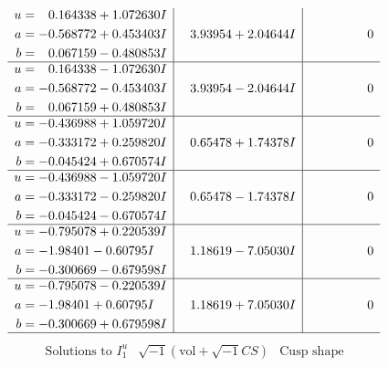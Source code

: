 \documentclass[1p]{elsarticle_modified}
\theoremstyle{definition}
\newcommand{\I}{\sqrt{-1}}
\begin{document}
$$\begin{array}{c|c|c}
\begin{aligned}
u &= \phantom{-}0.164338 + 1.072630 I \\
a &= -0.568772 + 0.453403 I \\
b &= \phantom{-}0.067159 - 0.480853 I\end{aligned}
 & \phantom{-}3.93954 + 2.04644 I & \phantom{-0.000000 } 0 \\ \hline\begin{aligned}
u &= \phantom{-}0.164338 - 1.072630 I \\
a &= -0.568772 - 0.453403 I \\
b &= \phantom{-}0.067159 + 0.480853 I\end{aligned}
 & \phantom{-}3.93954 - 2.04644 I & \phantom{-0.000000 } 0 \\ \hline\begin{aligned}
u &= -0.436988 + 1.059720 I \\
a &= -0.333172 + 0.259820 I \\
b &= -0.045424 + 0.670574 I\end{aligned}
 & \phantom{-}0.65478 + 1.74378 I & \phantom{-0.000000 } 0 \\ \hline\begin{aligned}
u &= -0.436988 - 1.059720 I \\
a &= -0.333172 - 0.259820 I \\
b &= -0.045424 - 0.670574 I\end{aligned}
 & \phantom{-}0.65478 - 1.74378 I & \phantom{-0.000000 } 0 \\ \hline\begin{aligned}
u &= -0.795078 + 0.220539 I \\
a &= -1.98401 - 0.60795 I \\
b &= -0.300669 - 0.679598 I\end{aligned}
 & \phantom{-}1.18619 - 7.05030 I & \phantom{-0.000000 } 0 \\ \hline\begin{aligned}
u &= -0.795078 - 0.220539 I \\
a &= -1.98401 + 0.60795 I \\
b &= -0.300669 + 0.679598 I\end{aligned}
 & \phantom{-}1.18619 + 7.05030 I & \phantom{-0.000000 } 0\\
 \hline 
 \end{array}$$\newpage$$\begin{array}{c|c|c}  
\text{Solutions to }I^u_{1}& \I (\text{vol} + \sqrt{-1}CS) & \text{Cusp shape}\\
 \hline 
\begin{aligned}

\end{aligned}
\end{array}$$
\end{document}
